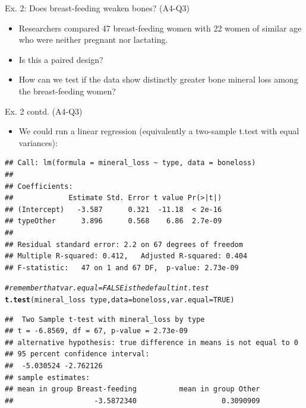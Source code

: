 \documentclass[handout]{beamer}\usepackage[]{graphicx}\usepackage[]{color}
\newcommand{\hlnum}[1]{\textcolor[rgb]{0.686,0.059,0.569}{#1}}%
\newcommand{\hlcom}[1]{\textcolor[rgb]{0.678,0.584,0.686}{\textit{#1}}}%
\newcommand{\hlopt}[1]{\textcolor[rgb]{0,0,0}{#1}}%
\newcommand{\hlstd}[1]{\textcolor[rgb]{0.345,0.345,0.345}{#1}}%
\newcommand{\hlkwc}[1]{\textcolor[rgb]{0.333,0.667,0.333}{#1}}%
\newcommand{\hlkwd}[1]{\textcolor[rgb]{0.737,0.353,0.396}{\textbf{#1}}}%
\newenvironment{knitrout}{}{} %
\begin{document}
\begin{frame}[fragile]{Ex. 2: Does breast-feeding weaken bones? (A4-Q3)}
\begin{minipage}{0.47\textwidth}
\begin{knitrout}
{}



\end{knitrout}
	
\end{minipage}
\begin{minipage}{0.5\textwidth}
	\pause 
	\begin{itemize}
		\small
		\setlength\itemsep{1em}
		\item  Researchers compared 47 breast-feeding women with 22 women of similar age who were neither pregnant nor lactating.
		\item Is this a paired design?
		\item How can we test if the data show distinctly greater bone mineral loss among the breast-feeding women?
	\end{itemize}
\end{minipage}

\end{frame}


\begin{frame}[fragile]{Ex. 2 contd. (A4-Q3)}
	\begin{itemize}
	\small
	\setlength\itemsep{1em}
	\item  We could run a linear regression (equivalently a two-sample t.test with equal variances):
\end{itemize}

\begin{knitrout}\tiny
{}\color{fgcolor}
\begin{verbatim}
## Call: lm(formula = mineral_loss ~ type, data = boneloss)
## 
## Coefficients:
##             Estimate Std. Error t value Pr(>|t|)
## (Intercept)   -3.587      0.321  -11.18  < 2e-16
## typeOther      3.896      0.568    6.86  2.7e-09
## 
## Residual standard error: 2.2 on 67 degrees of freedom
## Multiple R-squared: 0.412,	Adjusted R-squared: 0.404 
## F-statistic:   47 on 1 and 67 DF,  p-value: 2.73e-09
\end{verbatim}
\begin{alltt}
\hlcom{# remember that var.equal=FALSE is the default in t.test }
\hlkwd{t.test}\hlstd{(mineral_loss} \hlopt{~} \hlstd{type,} \hlkwc{data} \hlstd{= boneloss,} \hlkwc{var.equal} \hlstd{=} \hlnum{TRUE}\hlstd{)}
\end{alltt}
\begin{verbatim}
##  Two Sample t-test with mineral_loss by type 
## t = -6.8569, df = 67, p-value = 2.73e-09
## alternative hypothesis: true difference in means is not equal to 0 
## 95 percent confidence interval:
##  -5.030524 -2.762126 
## sample estimates:
## mean in group Breast-feeding          mean in group Other 
##                   -3.5872340                    0.3090909
\end{verbatim}

\end{knitrout}


\end{frame}
\end{document}
